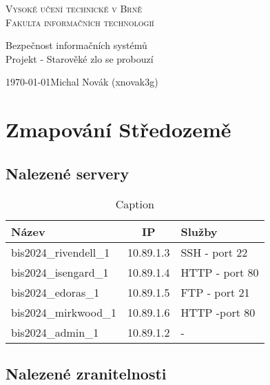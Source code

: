 \documentclass[a4paper, 11pt]{article}
\begin{document}
    \begin{titlepage}
        \begin{center}
            \Huge{\scshape{Vysoké učení technické v Brně}\\}
            \huge{\scshape Fakulta informačních technologií\\}

            \LARGE{Bezpečnost informačních systémů\\}
            \Huge{Projekt \-- Starověké zlo se probouzí}

        \end{center}
        
        \Large{\today \hfill Michal Novák (xnovak3g)}
    \end{titlepage}


\section{Zmapování Středozemě}
\subsection{Nalezené servery}

\begin{table}[!ht]
    \centering
    \begin{tabular}{|l|c|l|}
         \hline
         Název & IP & Služby \\ 
         \hline\hline
         bis2024\_rivendell\_1 & 10.89.1.3 & SSH - port 22\\ 
         \hline
         bis2024\_isengard\_1 & 10.89.1.4 & HTTP - port 80\\
         \hline
         bis2024\_edoras\_1 & 10.89.1.5 & FTP - port 21\\
         \hline
         bis2024\_mirkwood\_1 & 10.89.1.6 & HTTP -port 80\\
         \hline
         bis2024\_admin\_1 & 10.89.1.2 & - \\
         \hline
         
    \end{tabular}
    \caption{Caption}
    \label{tab:my_label}
\end{table}

\subsection{Nalezené zranitelnosti}
\end{document}

